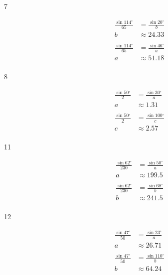 \documentclass{exam}
\newcommand{\dg}{\ensuremath{^\circ}}
\begin{document}
\begin{description}
      \item[7] 
        \begin{align*}
          \frac{\sin 114 \dg}{65} & = \frac{\sin 20 \dg}{b} \\
          b                       & \approx \boxed{ 24.33 } \\
          \\
          \frac{\sin 114 \dg}{65} & = \frac{\sin 46 \dg}{a} \\
          a                       & \approx \boxed{ 51.18 } \\
        \end{align*}

      \item[8] 
        \begin{align*}
          \frac{\sin 50 \dg}{2} & = \frac{\sin 30 \dg}{a} \\
          a                       & \approx \boxed{ 1.31 } \\
          \\
          \frac{\sin 50 \dg}{2} & = \frac{\sin 100 \dg}{c} \\
          c                       & \approx \boxed{ 2.57 } \\
        \end{align*}

      \item[11] 
        \begin{align*}
          \frac{\sin 62 \dg}{230} & = \frac{\sin 50 \dg}{a} \\
          a                       & \approx \boxed{ 199.5 } \\
          \\
          \frac{\sin 62 \dg}{230} & = \frac{\sin 68 \dg}{b} \\
          b                       & \approx \boxed{ 241.5 } \\
        \end{align*}

      \item[12] 
        \begin{align*}
          \frac{\sin 47 \dg}{50} & = \frac{\sin 23 \dg}{a} \\
          a                      & \approx \boxed{ 26.71 } \\
          \\
          \frac{\sin 47 \dg}{50} & = \frac{\sin 110 \dg}{b} \\
          b                       & \approx \boxed{ 64.24 } \\
        \end{align*}


\end{description}
\end{document}
